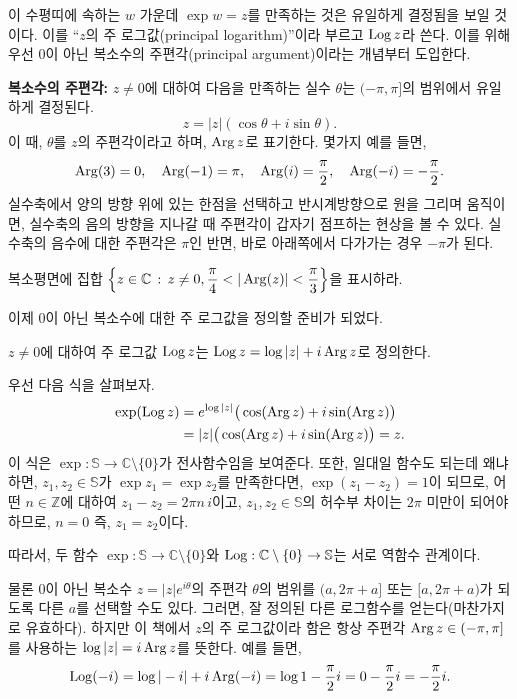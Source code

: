 이 수평띠에 속하는 $w$ 가운데 $\exp w = z$를 만족하는 것은
유일하게 결정됨을 보일 것이다. 
이를 ``$z$의 주 로그값(principal logarithm)''이라 부르고 $\mathop{\mathrm{Log}} z$라 쓴다.
이를 위해 우선 $0$이 아닌 복소수의 주편각(principal argument)이라는 개념부터 도입한다.

{\bf 복소수의 주편각: }
$z\ne0$에 대하여 다음을 만족하는 실수 $\theta$는 $(-\pi, \pi]$의 범위에서 유일하게 결정된다.
$$
z = |z|(\cos \theta + i\sin\theta).
$$
이 때, $\theta$를 $z$의 주편각이라고 하며, $\mathop{\mathrm{Arg}} z$로 표기한다.
몇가지 예를 들면,
$$
\mathop{\mathrm{Arg}}(3) = 0, \quad \mathop{\mathrm{Arg}}(-1)=\pi, \quad
\mathop{\mathrm{Arg}}(i) = \frac\pi2, \quad \mathop{\mathrm{Arg}}(-i) = - \frac\pi2.
$$
실수축에서 양의 방향 위에 있는 한점을 선택하고
반시계방향으로 원을 그리며 움직이면, 실수축의 음의 방향을 지나갈 때
주편각이 갑자기 점프하는 현상을 볼 수 있다.
실수축의 음수에 대한 주편각은 $\pi$인 반면,
바로 아래쪽에서 다가가는 경우 $-\pi$가 된다.

\begin{salt_exercise}\label{ex-1-39}
복소평면에 집합 $\left\{ z \in\mathbb C \,:\, z\ne0, \displaystyle\frac\pi4 < |\mathop{\mathrm{Arg}}(z)| < \displaystyle\frac\pi3 \right\}$을
표시하라.
\end{salt_exercise}

이제 $0$이 아닌 복소수에 대한 주 로그값을 정의할 준비가 되었다.

\begin{saltdefinition} {}{} \label{def-1-3}
$z\ne0$에 대하여 주 로그값 $\mathop{\mathrm{Log}} z$는 
$\mathop{\mathrm{Log}} z = \log |z| + i\mathop{\mathrm{Arg}} z$로 정의한다.
\end{saltdefinition}

우선 다음 식을 살펴보자.
\begin{align*}
\exp(\mathop{\mathrm{Log}} z) &= e^{\log |z|} \big( \cos(\mathop{\mathrm{Arg}} z) + i \sin(\mathop{\mathrm{Arg}} z) \big) \\
&= |z| \big( \cos(\mathop{\mathrm{Arg}} z) + i \sin(\mathop{\mathrm{Arg}} z) \big) = z.
\end{align*}
이 식은  $\exp: \mathbb S \to \mathbb C \setminus \{0\}$가 전사함수임을 보여준다.
또한, 일대일 함수도 되는데 왜냐 하면, $z_1, z_2 \in \mathbb S$가 $\exp z_1 = \exp z_2$를 만족한다면,
$\exp(z_1 - z_2) = 1$이 되므로, 
어떤 $n\in\mathbb Z$에 대하여 $z_1 - z_2 = 2\pi n\,i$이고,
$z_1, z_2 \in \mathbb S$의 허수부 차이는 $2\pi$ 미만이 되어야 하므로, $n=0$ 즉, 
$z_1 = z_2$이다.

따라서, 두 함수 $\exp : \mathbb S \to \mathbb C \setminus \{0\}$와
$\mathop{\mathrm{Log}} : \mathbb C \setminus \{0\} \to \mathbb S$는 서로 역함수 관계이다.

물론 $0$이 아닌 복소수 $z=|z|e^{i\theta}$의 주편각 $\theta$의 범위를 
$(a, 2\pi +a]$ 또는 $[a, 2\pi+a)$가 되도록 다른 $a$를 선택할 수도 있다.
그러면, 잘 정의된 다른 로그함수를 얻는다(마찬가지로 유효하다).
하지만 이 책에서 $z$의 주 로그값이라 함은 항상 주편각 $\mathop{\mathrm{Arg}} z \in (-\pi, \pi]$를 사용하는
$\log |z| = i\mathop{\mathrm{Arg}} z$를 뜻한다.
예를 들면,
$$
\mathop{\mathrm{Log}} (-i) = \log|-i| + i\mathop{\mathrm{Arg}}(-i) = \log 1 - \displaystyle\frac\pi2 i = 0 - \displaystyle\frac\pi 2 i = -\displaystyle\frac\pi 2 i.
$$

